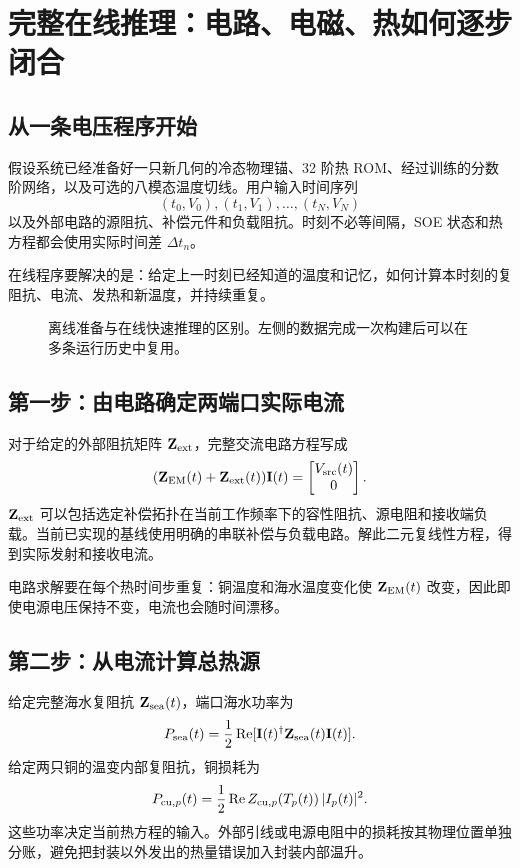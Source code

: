 \chapter{完整在线推理：电路、电磁、热如何逐步闭合}
\label{ch:coupling}

\section{从一条电压程序开始}
假设系统已经准备好一只新几何的冷态物理锚、32 阶热 ROM、经过训练的分数阶网络，以及可选的八模态温度切线。用户输入时间序列
\[
(t_0,V_0),(t_1,V_1),\dots,(t_N,V_N)
\]
以及外部电路的源阻抗、补偿元件和负载阻抗。时刻不必等间隔，SOE 状态和热方程都会使用实际时间差 $\Delta t_n$。

在线程序要解决的是：给定上一时刻已经知道的温度和记忆，如何计算本时刻的复阻抗、电流、发热和新温度，并持续重复。

\begin{figure}[htbp]
\centering\resizebox{\textwidth}{!}{}
\caption{离线准备与在线快速推理的区别。左侧的数据完成一次构建后可以在多条运行历史中复用。}
\label{fig:online}
\end{figure}

\section{第一步：由电路确定两端口实际电流}
对于给定的外部阻抗矩阵 $\mathbf Z_{\mathrm{ext}}$，完整交流电路方程写成
\begin{equation}
\label{eq:circuit}
(\mathbf Z_{\mathrm{EM}}(t)+\mathbf Z_{\mathrm{ext}}(t))\mathbf I(t)=
\begin{bmatrix}V_{\rm src}(t)\\0\end{bmatrix}.
\end{equation}
$\mathbf Z_{\mathrm{ext}}$ 可以包括选定补偿拓扑在当前工作频率下的容性阻抗、源电阻和接收端负载。当前已实现的基线使用明确的串联补偿与负载电路。解此二元复线性方程，得到实际发射和接收电流。

电路求解要在每个热时间步重复：铜温度和海水温度变化使 $\mathbf Z_{\mathrm{EM}}(t)$ 改变，因此即使电源电压保持不变，电流也会随时间漂移。

\section{第二步：从电流计算总热源}
给定完整海水复阻抗 $\mathbf Z_{\mathrm{sea}}(t)$，端口海水功率为
\begin{equation}
\label{eq:psea}
P_{\rm sea}(t)=\frac12
\operatorname{Re}[\mathbf I(t)^\dagger\mathbf Z_{\mathrm{sea}}(t)\mathbf I(t)].
\end{equation}
给定两只铜的温变内部复阻抗，铜损耗为
\[
P_{{\rm cu},p}(t)=\frac12
\operatorname{Re}Z_{{\rm cu},p}(T_p(t))\,|I_p(t)|^2.
\]
这些功率决定当前热方程的输入。外部引线或电源电阻中的损耗按其物理位置单独分账，避免把封装以外发出的热量错误加入封装内部温升。

